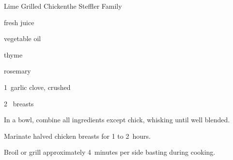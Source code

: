 \begin{recipe}{Lime Grilled Chicken}{the Steffler Family}{}

\begin{ingredients}
\item \C{\half} fresh  juice
\item \C{\quarter} vegetable oil
\item {} 
\item {} thyme
\item {} rosemary
\item 1~garlic clove, crushed 
\item 2~ breasts
\end{ingredients}

\begin{directions}
\item In a bowl, combine all ingredients except chick, whisking until well blended.
\item Marinate halved chicken breasts for 1 to 2~hours.
\item Broil or grill approximately 4~minutes per side basting during cooking.
\end{directions}
\end{recipe}

